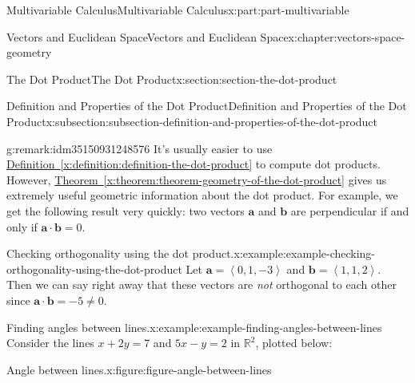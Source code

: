 \documentclass[twoside,10pt,]{tufte-book}
\newcommand{\xreffont}{\relax}
\numberwithin{equation}{part}
\newcommand{\RR}{\mathbb{R}}
\newcommand{\dotprod}[1]{\left\langle #1 \right\rangle}
\begin{document}
\begin{partptx}{Multivariable Calculus}{}{Multivariable Calculus}{}{}{x:part:part-multivariable}
\begin{chapterptx}{Vectors and Euclidean Space}{}{Vectors and Euclidean Space}{}{}{x:chapter:vectors-space-geometry}
\begin{sectionptx}{The Dot Product}{}{The Dot Product}{}{}{x:section:section-the-dot-product}
\begin{subsectionptx}{Definition and Properties of the Dot Product}{}{Definition and Properties of the Dot Product}{}{}{x:subsection:subsection-definition-and-properties-of-the-dot-product}
\begin{remark}{}{g:remark:idm35150931248576}
It's usually easier to use \hyperref[x:definition:definition-the-dot-product]{Definition~{\xreffont\ref{x:definition:definition-the-dot-product}}} to compute dot products. However, \hyperref[x:theorem:theorem-geometry-of-the-dot-product]{Theorem~{\xreffont\ref{x:theorem:theorem-geometry-of-the-dot-product}}} gives us extremely useful geometric information about the dot product. For example, we get the following result very quickly: two vectors \(\mathbf{a}\) and \(\mathbf{b}\) are perpendicular if and only if \(\mathbf{a}\cdot\mathbf{b} = 0\).%
\end{remark}
\begin{example}{Checking orthogonality using the dot product.}{x:example:example-checking-orthogonality-using-the-dot-product}%
Let \(\mathbf{a} = \dotprod{0,1,-3}\) and \(\mathbf{b} = \dotprod{1,1,2}.\) Then we can say right away that these vectors are \emph{not} orthogonal to each other since \(\mathbf{a}\cdot\mathbf{b} = -5 \neq 0\).%
\end{example}
\begin{example}{Finding angles between lines.}{x:example:example-finding-angles-between-lines}%
Consider the lines \(x+2y = 7\) and \(5x-y = 2\) in \(\RR^{2}\), plotted below:%
\begin{figureptx}{Angle between lines.}{x:figure:figure-angle-between-lines}{}%
\begin{image}{0.1}{0.8}{0.1}%
\end{image}
\end{figureptx}
\end{example}
\end{subsectionptx}
\end{sectionptx}
\end{chapterptx}
\end{partptx}
\end{document}
